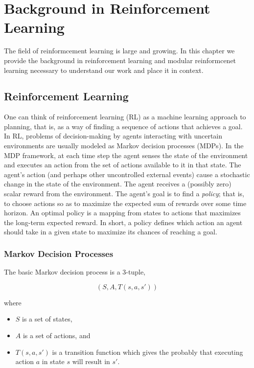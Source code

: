 \chapter{Background in Reinforcement Learning}\label{ch:rl}

The field of reinformcement learning is large and growing. In this chapter we provide the background in reinforcement learning and modular reinformcenet learning necessary to understand our work and place it in context.

\section{Reinforcement Learning}

One can think of reinforcement learning (RL) \cite{sutton1998reinforcement,kaelbling1996reinforcement} as a machine learning approach to planning, that is, as a way of finding a sequence of actions that achieves a goal. In RL, problems of decision-making by agents interacting with uncertain environments are usually modeled as Markov decision processes (MDPs). In the MDP framework, at each time step the agent senses the state of the environment and executes an action from the set of actions available to it in that state. The agent's action (and perhaps other uncontrolled external events) cause a stochastic change in the state of the environment. The agent receives a (possibly zero) scalar reward from the environment. The agent's goal is to find a {\it policy}; that is, to choose actions so as to maximize the expected sum of rewards over some time horizon. An optimal policy is a mapping from states to actions that maximizes the long-term expected reward.  In short, a policy defines which action an agent should take in a given state to maximize its chances of reaching a goal.

\subsection{Markov Decision Processes}

The basic Markov decision process is a 3-tuple,

\begin{equation}
(S, A, T(s, a, s'))
\end{equation}

where

\begin{itemize}
\item $S$ is a set of states,
\item $A$ is a set of actions, and
\item $T(s, a, s')$ is a transition function which gives the probably that executing action $a$ in state $s$ will result in $s'$.
\end{itemize}

